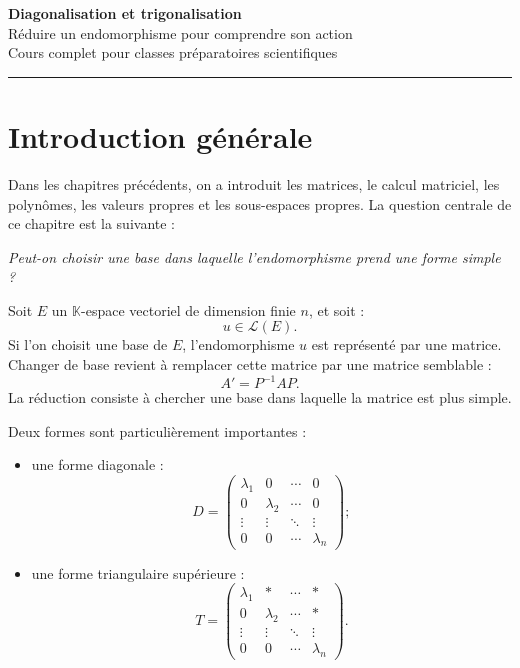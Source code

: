 \documentclass[11pt,a4paper]{article}
\newcommand{\K}{\mathbb K}
\newcommand{\Lcal}{\mathcal L}
\begin{document}
\begin{center}
    {\Huge \textbf{Diagonalisation et trigonalisation}}\\[2mm]
    {\Large Réduire un endomorphisme pour comprendre son action}\\[2mm]
    {\large Cours complet pour classes préparatoires scientifiques}\\[2mm]
    \rule{0.88\linewidth}{0.5pt}
\end{center}

\vspace{0.4cm}

\tableofcontents

\newpage

\section*{Introduction générale}

Dans les chapitres précédents, on a introduit les matrices, le calcul matriciel, les polynômes, les valeurs propres et les sous-espaces propres.  
La question centrale de ce chapitre est la suivante :

\begin{center}
\textit{Peut-on choisir une base dans laquelle l'endomorphisme prend une forme simple ?}
\end{center}

Soit \(E\) un \(\K\)-espace vectoriel de dimension finie \(n\), et soit :
\[
u\in\Lcal(E).
\]
Si l'on choisit une base de \(E\), l'endomorphisme \(u\) est représenté par une matrice.  
Changer de base revient à remplacer cette matrice par une matrice semblable :
\[
A' = P^{-1}AP.
\]
La réduction consiste à chercher une base dans laquelle la matrice est plus simple.

Deux formes sont particulièrement importantes :

\begin{itemize}
    \item une forme diagonale :
    \[
    D=
    \begin{pmatrix}
    \lambda_1&0&\cdots&0\\
    0&\lambda_2&\cdots&0\\
    \vdots&\vdots&\ddots&\vdots\\
    0&0&\cdots&\lambda_n
    \end{pmatrix};
    \]
    \item une forme triangulaire supérieure :
    \[
    T=
    \begin{pmatrix}
    \lambda_1&*&\cdots&*\\
    0&\lambda_2&\cdots&*\\
    \vdots&\vdots&\ddots&\vdots\\
    0&0&\cdots&\lambda_n
    \end{pmatrix}.
    \]
\end{itemize}
\end{document}
